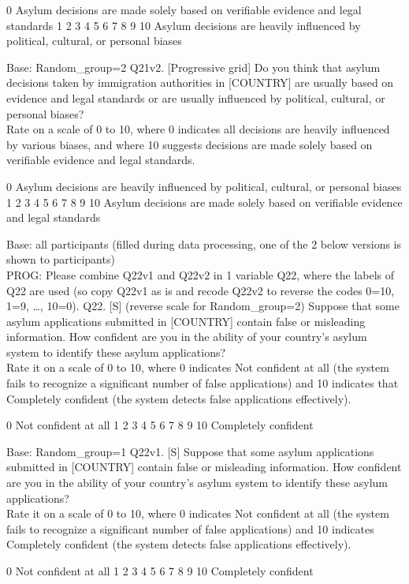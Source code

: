 \documentclass[
  12pt,
  a4paper,
]{article}
\begin{document}
0
Asylum decisions are made solely based on verifiable evidence and legal standards 1 2 3 4 5 6 7 8 9 10
Asylum decisions are heavily influenced by political, cultural, or personal biases

Base: Random\_group=2
Q21v2. {[}Progressive grid{]} Do you think that asylum decisions taken by immigration authorities in {[}COUNTRY{]} are usually based on evidence and legal standards or are usually influenced by political, cultural, or personal biases?\\
Rate on a scale of 0 to 10, where 0 indicates all decisions are heavily influenced by various biases, and where 10 suggests decisions are made solely based on verifiable evidence and legal standards.

0
Asylum decisions are heavily influenced by political, cultural, or personal biases 1 2 3 4 5 6 7 8 9 10
Asylum decisions are made solely based on verifiable evidence and legal standards

Base: all participants (filled during data processing, one of the 2 below versions is shown to participants)\\
PROG: Please combine Q22v1 and Q22v2 in 1 variable Q22, where the labels of Q22 are used (so copy Q22v1 as is and recode Q22v2 to reverse the codes 0=10, 1=9, \ldots, 10=0).
Q22. {[}S{]} (reverse scale for Random\_group=2) Suppose that some asylum applications submitted in {[}COUNTRY{]} contain false or misleading information. How confident are you in the ability of your country's asylum system to identify these asylum applications?\\
Rate it on a scale of 0 to 10, where 0 indicates Not confident at all (the system fails to recognize a significant number of false applications) and 10 indicates that Completely confident (the system detects false applications effectively).

0
Not confident at all 1 2 3 4 5 6 7 8 9 10
Completely confident

Base: Random\_group=1
Q22v1. {[}S{]} Suppose that some asylum applications submitted in {[}COUNTRY{]} contain false or misleading information. How confident are you in the ability of your country's asylum system to identify these asylum applications?\\
Rate it on a scale of 0 to 10, where 0 indicates Not confident at all (the system fails to recognize a significant number of false applications) and 10 indicates Completely confident (the system detects false applications effectively).

0
Not confident at all 1 2 3 4 5 6 7 8 9 10
Completely confident
\end{document}
